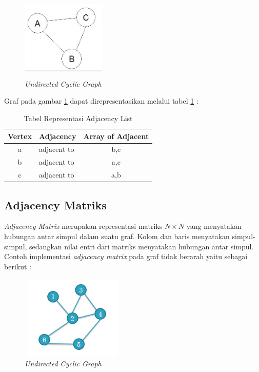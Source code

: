  	\begin{figure} [H]
		\centering  
		\includegraphics[width=4cm, height=4cm]{adjacencylist} 
		\caption[\textit{Undirected Cyclic Graph}]{\textit{Undirected Cyclic Graph}}
		\label{fig:GambarAL} 
	\end{figure}
	
	Graf pada gambar \ref{fig:GambarAL} dapat direpresentasikan melalui tabel \ref{tabelAL} :
	
	
	\begin{table}[H]
\centering
\caption{Tabel Representasi Adjacency List}
\begin{tabular}{|c|p{2cm}|c|}
\hline
Vertex & Adjacency & Array of Adjacent\\
\hline
a & adjacent to & b,c \\
\hline
b & adjacent to & a,c \\
\hline
c & adjacent to & a,b\\
\hline
\end{tabular}
\label{tabelAL}
\end{table}

\subsection{Adjacency Matriks}
\textit{Adjacency Matrix} merupakan representasi matriks $N \times N$ yang menyatakan hubungan antar simpul dalam suatu graf. Kolom dan baris menyatakan simpul-simpul, sedangkan nilai entri dari matriks menyatakan hubungan antar simpul. Contoh implementasi \textit{adjacency matrix} pada graf tidak berarah yaitu sebagai berikut :

\begin{figure} [H]
		\centering  
		\includegraphics[width=5cm, height=4cm]{adjacencymatrix} 
		\caption[\textit{Undirected Cyclic Graph}]{\textit{Undirected Cyclic Graph}}
		\label{fig:GambarAM} 
	\end{figure}


